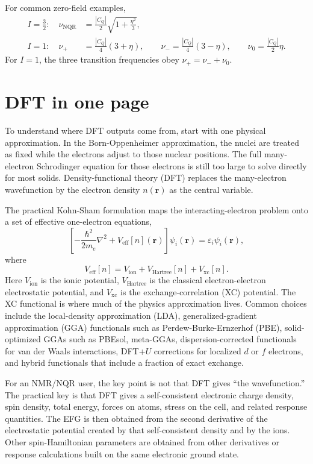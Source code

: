 \documentclass[11pt]{article}
\newcommand{\CQ}{C_Q}
\newcommand{\etaEFG}{\eta}
\begin{document}
For common zero-field examples,
\begin{align}
I=\frac{3}{2}:\quad
\nu_{\mathrm{NQR}} &= \frac{|\CQ|}{2}\sqrt{1+\frac{\etaEFG^2}{3}},
\label{eq:spin32freq}\\[3pt]
I=1:\quad
\nu_+ &= \frac{|\CQ|}{4}(3+\etaEFG),\qquad
\nu_- = \frac{|\CQ|}{4}(3-\etaEFG),\qquad
\nu_0 = \frac{|\CQ|}{2}\etaEFG .
\label{eq:spin1freqs}
\end{align}
For $I=1$, the three transition frequencies obey $\nu_+=\nu_-+\nu_0$.

\section{DFT in one page}

To understand where DFT outputs come from, start with one physical approximation.  In the Born-Oppenheimer approximation, the nuclei are treated as fixed while the electrons adjust to those nuclear positions.  The full many-electron Schrodinger equation for those electrons is still too large to solve directly for most solids.  Density-functional theory (DFT) replaces the many-electron wavefunction by the electron density $n(\mathbf r)$ as the central variable.

The practical Kohn-Sham formulation maps the interacting-electron problem onto a set of effective one-electron equations,
\begin{equation}
\left[-\frac{\hbar^2}{2m_e}\nabla^2 + V_{\mathrm{eff}}[n](\mathbf r)\right]\psi_i(\mathbf r)
= \varepsilon_i\psi_i(\mathbf r),
\label{eq:ks}
\end{equation}
where
\begin{equation}
V_{\mathrm{eff}}[n] = V_{\mathrm{ion}} + V_{\mathrm{Hartree}}[n] + V_{\mathrm{xc}}[n].
\end{equation}
Here $V_{\mathrm{ion}}$ is the ionic potential, $V_{\mathrm{Hartree}}$ is the classical electron-electron electrostatic potential, and $V_{\mathrm{xc}}$ is the exchange-correlation (XC) potential.  The XC functional is where much of the physics approximation lives.  Common choices include the local-density approximation (LDA), generalized-gradient approximation (GGA) functionals such as Perdew-Burke-Ernzerhof (PBE), solid-optimized GGAs such as PBEsol, meta-GGAs, dispersion-corrected functionals for van der Waals interactions, DFT+$U$ corrections for localized $d$ or $f$ electrons, and hybrid functionals that include a fraction of exact exchange.

For an NMR/NQR user, the key point is not that DFT gives ``the wavefunction.''  The practical key is that DFT gives a self-consistent electronic charge density, spin density, total energy, forces on atoms, stress on the cell, and related response quantities.  The EFG is then obtained from the second derivative of the electrostatic potential created by that self-consistent density and by the ions.  Other spin-Hamiltonian parameters are obtained from other derivatives or response calculations built on the same electronic ground state.
\end{document}
